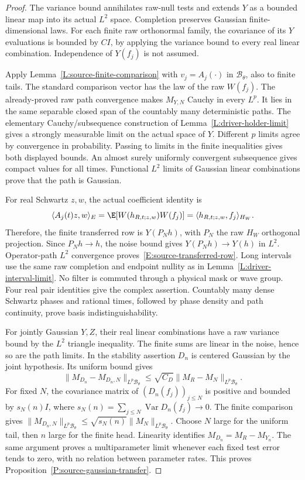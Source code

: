 \begin{proof}
  The variance bound annihilates raw-null tests and extends $Y$ as a
  bounded linear map into its actual $L^2$ space. Completion preserves
  Gaussian finite-dimensional laws. For each finite raw orthonormal family,
  the covariance of its $Y$ evaluations is bounded by $CI$, by applying
  the variance bound to every real linear combination. Independence of
  $Y(f_j)$ is not assumed.

  Apply Lemma~\ref{L:source-finite-comparison} with $v_j=A_j(\cdot)$ in
  $\mathscr B_\theta$, also to finite tails. The standard comparison vector
  has the law of the raw $W(f_j)$. The already-proved raw path convergence
  makes $M_{Y,N}$ Cauchy in every $L^p$. It lies in the same separable
  closed span of the countably many deterministic paths. The elementary
  Cauchy/subsequence construction of Lemma~\ref{L:driver-holder-limit}
  gives a strongly measurable limit on the actual space of $Y$.
  Different $p$ limits agree by convergence in probability. Passing to
  limits in the finite inequalities gives both displayed bounds. An
  almost surely uniformly convergent subsequence gives compact values
  for all times. Functional $L^2$ limits of Gaussian linear combinations
  prove that the path is Gaussian.

  For real Schwartz $z,w$, the actual coefficient identity is
  \[
    \langle A_j(t)z,w\rangle_E
    =\E[W(h_{R,t;z,w})W(f_j)]
    =\langle h_{R,t;z,w},f_j\rangle_{H_W}.
  \]
  Therefore, the finite transferred row is $Y(P_Nh)$, with $P_N$ the
  raw $H_W$ orthogonal projection. Since $P_Nh\to h$, the noise bound
  gives $Y(P_Nh)\to Y(h)$ in $L^2$. Operator-path $L^2$ convergence
  proves~\eqref{E:source-transferred-row}. Long intervals use the same
  raw completion and endpoint nullity as in Lemma~\ref{L:driver-interval-limit}.
  No filter is commuted through a physical mask or wave group. Four
  real pair identities give the complex assertion. Countably many dense
  Schwartz phases and rational times, followed by phase density and path
  continuity, prove basis indistinguishability.

  For jointly Gaussian $Y,Z$, their real linear combinations have a raw
  variance bound by the $L^2$ triangle inequality. The finite sums are
  linear in the noise, hence so are the path limits. In the stability
  assertion $D_n$ is centered Gaussian by the joint hypothesis. Its
  uniform bound gives
  \[
    \|M_{D_n}-M_{D_n,N}\|_{L^p\mathscr B_\theta}
    \le\sqrt{C_D}\|M_R-M_N\|_{L^p\mathscr B_\theta}.
  \]
  For fixed $N$, the covariance matrix of $(D_n(f_j))_{j\le N}$ is
  positive and bounded by $s_N(n)I$, where
  $s_N(n)=\sum_{j\le N}\operatorname{Var}D_n(f_j)\to0$.
  The finite comparison gives
  $\|M_{D_n,N}\|_{L^p\mathscr B_\theta}
  \le\sqrt{s_N(n)}\|M_N\|_{L^p\mathscr B_\theta}$.
  Choose $N$ large for the uniform tail, then $n$ large for the finite
  head. Linearity identifies $M_{D_n}=M_R-M_{Y_n}$. The same argument
  proves a multiparameter limit whenever each fixed test error tends
  to zero, with no relation between parameter rates.
  This proves Proposition~\ref{P:source-gaussian-transfer}.
\end{proof}

